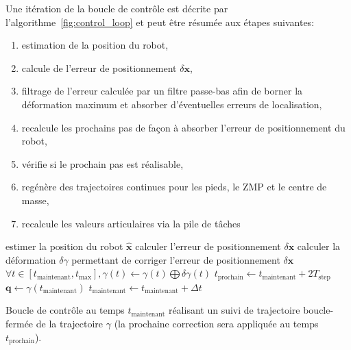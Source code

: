 Une itération de la boucle de contrôle est décrite par
l'algorithme \ref{fig:control_loop} et peut être résumée aux étapes
suivantes:

\begin{enumerate}
\item estimation de la position du robot,
\item calcule de l'erreur de positionnement \mbox{$\delta \mathbf{x}$},
\item filtrage de l'erreur calculée par un filtre passe-bas afin de
  borner la déformation maximum et absorber d'éventuelles erreurs de
  localisation,
\item recalcule les prochains pas de façon à absorber l'erreur de
  positionnement du robot,
\item vérifie si le prochain pas est réalisable,
\item regénère des trajectoires continues pour les pieds, le ZMP et le centre de masse,
\item recalcule les valeurs articulaires via la pile de tâches
\end{enumerate}


\begin{algorithm}
  \begin{algorithmic}
    \STATE estimer la position du robot $\mathbf{\hat{x}}$
    \STATE calculer l'erreur de positionnement $\delta \mathbf{x}$
    \STATE calculer la déformation $\delta \gamma$ permettant de
    corriger l'erreur de positionnement $\delta \mathbf{x}$
    \STATE $\forall t \in [t_{\text{maintenant}}, t_{\text{max}}],
    \gamma(t) \leftarrow \gamma(t) \bigoplus \delta \gamma(t)$
    \STATE $t_{\text{prochain}} \leftarrow t_{\text{maintenant}} + 2 T_{\text{step}}$
    \ENDIF
    \ENDIF
    \STATE $\mathbf{q} \leftarrow \gamma(t_{\text{maintenant}})$
    \STATE $t_{\text{maintenant}} \leftarrow t_{\text{maintenant}} + \Delta t$
  \end{algorithmic}
  \caption{Boucle de contrôle au temps $t_{\text{maintenant}}$ réalisant
    un suivi de trajectoire boucle-fermée de la trajectoire $\gamma$
    (la prochaine correction sera appliquée au temps
    $t_{\text{prochain}}$). \label{fig:control_loop}}
\end{algorithm}

